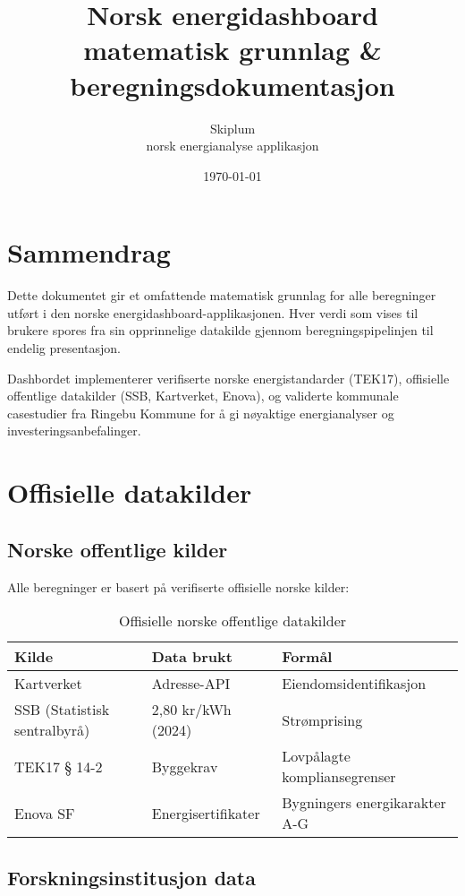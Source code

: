\documentclass[12pt,a4paper]{article}
\title{Norsk energidashboard\\matematisk grunnlag \& beregningsdokumentasjon}
\author{Skiplum\\norsk energianalyse applikasjon}
\date{\today}
\begin{document}
\maketitle

\tableofcontents
\newpage

\section{Sammendrag}

Dette dokumentet gir et omfattende matematisk grunnlag for alle beregninger utført i den norske energidashboard-applikasjonen. Hver verdi som vises til brukere spores fra sin opprinnelige datakilde gjennom beregningspipelinjen til endelig presentasjon.

Dashbordet implementerer verifiserte norske energistandarder (TEK17), offisielle offentlige datakilder (SSB, Kartverket, Enova), og validerte kommunale casestudier fra Ringebu Kommune for å gi nøyaktige energianalyser og investeringsanbefalinger.

\section{Offisielle datakilder}

\subsection{Norske offentlige kilder}

Alle beregninger er basert på verifiserte offisielle norske kilder:

\begin{table}[H]
\centering
\begin{tabular}{|l|l|l|}
\hline
\textbf{Kilde} & \textbf{Data brukt} & \textbf{Formål} \\
\hline
Kartverket & Adresse-API & Eiendomsidentifikasjon \\
SSB (Statistisk sentralbyrå) & 2,80 kr/kWh (2024) & Strømprising \\
TEK17 § 14-2 & Byggekrav & Lovpålagte kompliansegrenser \\
Enova SF & Energisertifikater & Bygningers energikarakter A-G \\
\hline
\end{tabular}
\caption{Offisielle norske offentlige datakilder}
\end{table}

\subsection{Forskningsinstitusjon data}
\end{document}

